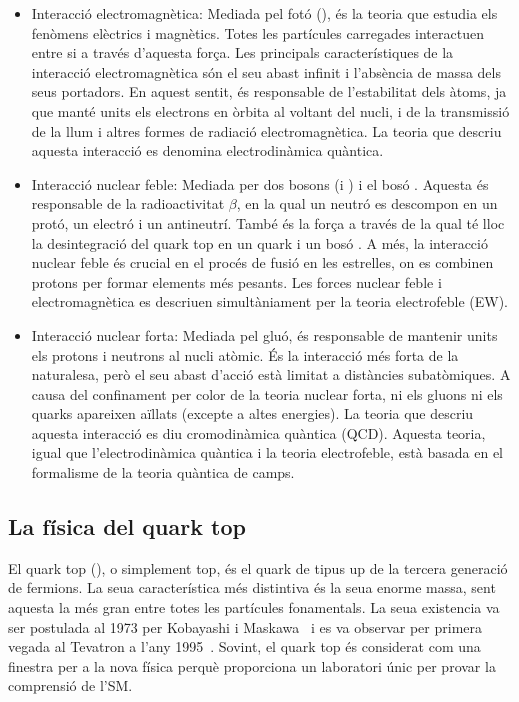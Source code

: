 \begin{itemize}
	\item Interacció electromagnètica: Mediada pel fotó (\Pgamma), és la teoria que estudia 
	els fenòmens elèctrics i magnètics. Totes les partícules carregades interactuen entre si a 
	través d'aquesta força. Les principals característiques de la interacció electromagnètica són 
	el seu abast infinit i l'absència de massa dels seus portadors. En aquest sentit, és responsable de l'estabilitat 
	dels àtoms, ja que manté units els electrons en òrbita al voltant del nucli, i de la transmissió 
	de la llum i altres formes de radiació electromagnètica. La teoria que descriu aquesta interacció 
	es denomina electrodinàmica quàntica.
	
	\item Interacció nuclear feble: Mediada per dos bosons \PW (\PWplus i \PWminus) i el bosó \PZ. 
	Aquesta és responsable de la radioactivitat $\beta$, en la qual un neutró es descompon en un 
	protó, un electró i un antineutrí. També és la força a través de la qual té lloc la desintegració del quark top 
	en un quark \Pbottom i un bosó \PW. A més, la interacció nuclear feble és crucial en el procés 
	de fusió en les estrelles, on es combinen protons per formar elements més pesants. Les forces 
	nuclear feble i electromagnètica es descriuen simultàniament per la teoria electrofeble (EW).
	
	\item Interacció nuclear forta: Mediada pel gluó, és responsable de mantenir units els protons i 
	neutrons al nucli atòmic. És la interacció més forta de la naturalesa, però el seu abast d'acció 
	està limitat a distàncies subatòmiques. A causa del confinament per color de la teoria nuclear 
	forta, ni els gluons ni els quarks apareixen aïllats (excepte a altes energies). La teoria que descriu 
	aquesta interacció es diu cromodinàmica quàntica (QCD). Aquesta teoria, igual que l'electrodinàmica 
	quàntica i la teoria electrofeble, està basada en el formalisme de la teoria quàntica de camps.
\end{itemize}






\subsection{La física del quark top}
\label{sec:resum:FisicaTop}
El quark top (\Ptop), o simplement top, és el quark de tipus up de la tercera generació de 
fermions. La seua característica més distintiva és la seua enorme massa, sent aquesta la més 
gran entre totes les partícules fonamentals. La seua existencia va ser postulada al 1973 
per Kobayashi i Maskawa~\cite{Kobayashi:1973fv} i es va observar per primera vegada al 
Tevatron a l'any 1995~\cite{CDF:1995wbb, D0:1995jca}.
Sovint, el quark top és considerat com una
finestra per a la nova física perquè proporciona un laboratori únic per provar la comprensió de l'SM.

